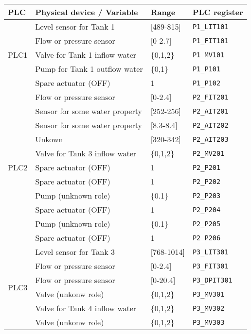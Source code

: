 \bigskip
{\small
	\begin{longtable}[c]{p{} p{} p{} p{}}
		\hline
		\textbf{PLC} & \textbf{Physical device / Variable} & \textbf{Range} & \textbf{PLC register} \\ [0.5ex] 
		\hline
		\multirow{5}{12em}{PLC1} & Level sensor for Tank 1 & [489-815] & \texttt{P1\_LIT101} \\ 
		& Flow or pressure sensor & [0-2.7] & \texttt{P1\_FIT101} \\
		& Valve for Tank 1 inflow water & \{0,1,2\} & \texttt{P1\_MV101} \\ 
		& Pump for Tank 1 outflow water & \{0,1\} & \texttt{P1\_P101} \\
		& Spare actuator (OFF) & 1 & \texttt{P1\_P102} \\
		\hline
		\multirow{11}{12em}{PLC2} & Flow or pressure sensor & [0-2.4] & \texttt{P2\_FIT201} \\
		& Sensor for some water property & [252-256] & \texttt{P2\_AIT201} \\
		& Sensor for some water property & [8.3-8.4] & \texttt{P2\_AIT202} \\
		& Unkown & [320-342] & \texttt{P2\_AIT203} \\
		& Valve for Tank 3 inflow water & \{0,1,2\} & \texttt{P2\_MV201} \\
		& Spare actuator (OFF) & 1 & \texttt{P2\_P201} \\
		& Spare actuator (OFF) & 1 & \texttt{P2\_P202} \\
		& Pump (unknown role) & \{0.1\} & \texttt{P2\_P203} \\
		& Spare actuator (OFF) & 1 & \texttt{P2\_P204} \\
		& Pump (unknown role) & \{0.1\} & \texttt{P2\_P205} \\
		& Spare actuator (OFF) & 1 & \texttt{P2\_P206} \\
		\hline
		\multirow{9}{12em}{PLC3} & Level sensor for Tank 3 & [768-1014] & \texttt{P3\_LIT301} \\
		& Flow or pressure sensor & [0-2.4] & \texttt{P3\_FIT301} \\
		& Flow or pressure sensor & [0-20.4] & \texttt{P3\_DPIT301} \\
		& Valve (unkonw role) & \{0,1,2\} & \texttt{P3\_MV301} \\
		& Valve for Tank 4 inflow water & \{0,1,2\} & \texttt{P3\_MV302} \\
		& Valve (unkonw role) & \{0,1,2\} & \texttt{P3\_MV303} \\

\end{longtable}}
